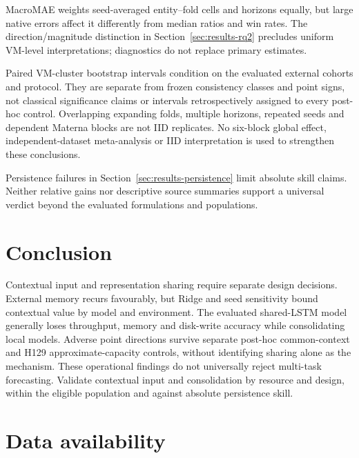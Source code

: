 \documentclass[a4paper,fleqn]{cas-dc}
\begin{document}
MacroMAE weights seed-averaged entity--fold cells and horizons equally, but
large native errors affect it differently from median ratios and win rates.
The direction/magnitude distinction in Section~\ref{sec:results-rq2} precludes
uniform VM-level interpretations; diagnostics do not replace primary estimates.

Paired VM-cluster bootstrap intervals condition on the evaluated external
cohorts and protocol. They are separate from frozen consistency classes and
point signs, not classical significance claims or intervals retrospectively
assigned to every post-hoc control. Overlapping expanding folds, multiple
horizons, repeated seeds and dependent Materna blocks are not IID replicates.
No six-block global effect, independent-dataset meta-analysis or IID
interpretation is used to strengthen these conclusions.

Persistence failures in Section~\ref{sec:results-persistence} limit absolute
skill claims. Neither relative gains nor descriptive source summaries support
a universal verdict beyond the evaluated formulations and populations.

\section{Conclusion}
\label{sec:conclusion}

Contextual input and representation sharing require separate design decisions.
External memory recurs favourably, but Ridge and seed sensitivity bound
contextual value by model and environment. The evaluated shared-LSTM model
generally loses throughput, memory and disk-write accuracy while consolidating
local models. Adverse point directions survive separate post-hoc common-context
and H129 approximate-capacity controls, without identifying sharing alone as
the mechanism. These operational findings do not universally reject multi-task
forecasting. Validate contextual input and consolidation by resource and design,
within the eligible population and against absolute persistence skill.

\section*{Data availability}
\end{document}
